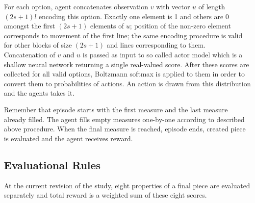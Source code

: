 \documentclass{article}
\begin{document}
For each option, agent concatenates observation $v$ with vector $u$ of length $(2s + 1)l$ encoding this option. Exactly one element is 1 and others are 0 amongst the first $(2s + 1)$ elements of $u$; position of the non-zero element corresponds to movement of the first line; the same encoding procedure is valid for other blocks of size $(2s + 1)$ and lines corresponding to them. Concatenation of $v$ and $u$ is passed as input to so called actor model which is a shallow neural network returning a single real-valued score. After these scores are collected for all valid options, Boltzmann softmax is applied to them in order to convert them to probabilities of actions. An action is drawn from this distribution and the agents takes it.

Remember that episode starts with the first measure and the last measure already filled. The agent fills empty measures one-by-one according to described above procedure. When the final measure is reached, episode ends, created piece is evaluated and the agent receives reward.

\subsection{Evaluational Rules}
\label{subsec:setup}

At the current revision of the study, eight properties of a final piece are evaluated separately and total reward is a weighted sum of these eight scores.
\end{document}
